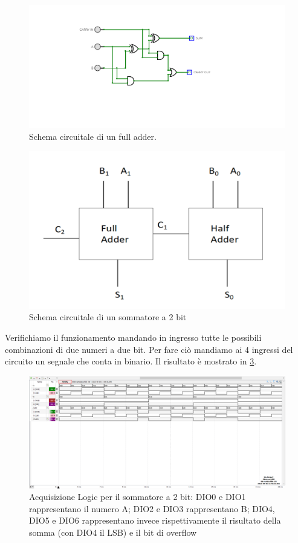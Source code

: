\documentclass[10pt, a4paper, italian]{article}
\begin{document}
\begin{figure}[htbp]
    \centering
    \includegraphics[width=0.6\linewidth]{full.png}
    \caption{Schema circuitale di un full adder.}
    \label{fig:fulladder}
\end{figure}

\begin{figure}[htbp]
    \centering
    \includegraphics[width=0.6\linewidth]{sum.png}
    \caption{Schema circuitale di un sommatore a 2 bit}
    \label{fig: sommatore}
\end{figure}

Verifichiamo il funzionamento mandando in ingresso tutte le possibili combinazioni di due numeri a due bit. Per fare ciò mandiamo ai 4 ingressi del circuito un segnale che conta in binario. Il risultato è mostrato in \cref{fig: faAD2}.

\begin{figure}[htbp]
    \centering
    \includegraphics[width=\linewidth]{sum_time.png}
    \caption{Acquisizione Logic per il sommatore a 2 bit: DIO0 e DIO1 rappresentano il numero A; DIO2 e DIO3 rappresentano B; DIO4, DIO5 e DIO6 rappresentano invece rispettivamente il risultato della somma (con DIO4 il LSB) e il bit di overflow}
    \label{fig: faAD2}
\end{figure}
\end{document}
